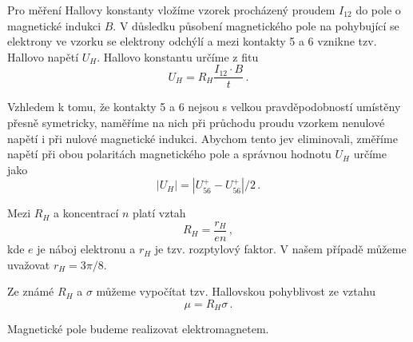 Pro měření Hallovy konstanty vložíme vzorek procházený proudem $I_{12}$ do pole o magnetické indukci $B$.
V důsledku působení magnetického pole na pohybující se elektrony ve vzorku se elektrony odchýlí a mezi kontakty 5 a 6 vznikne tzv. Hallovo napětí $U_H$.
Hallovo konstantu určíme z fitu \cite{skripta}
\begin{equation}
U_H=R_H\frac{I_{12} \cdot B}{t} \,.
\end{equation}

Vzhledem k tomu, že kontakty 5 a 6 nejsou s velkou pravděpodobností umístěny přesně symetricky, naměříme na nich při průchodu proudu vzorkem nenulové napětí i při nulové magnetické indukci.
Abychom tento jev eliminovali, změříme napětí při obou polaritách magnetického pole a správnou hodnotu $U_H$ určíme jako
\begin{equation}
| U_H |=|U_{56}^+ - U_{56}^+|/2 \,.
\end{equation}

Mezi $R_H$ a koncentrací $n$ platí vztah \cite{skripta}
\begin{equation}
R_H = \frac{r_H}{en} \,,
\end{equation}
kde $e$ je náboj elektronu a $r_H$ je tzv. rozptylový faktor.
V našem případě můžeme uvažovat $r_H = 3\pi/8$.

Ze známé $R_H$ a $\sigma$ můžeme vypočítat tzv. Hallovskou pohyblivost ze vztahu \cite{skripta}
\begin{equation}
\mu = R_H \sigma \,.
\end{equation}

Magnetické pole budeme realizovat elektromagnetem.